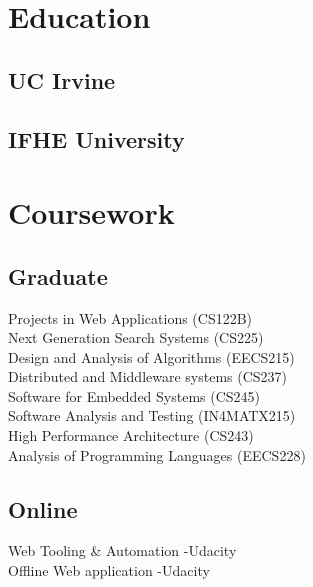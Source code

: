 \documentclass[]{base}
\begin{document}

\begin{minipage}[t]{0.33\textwidth}
	\section{Education} 
	
	\subsection{UC Irvine}
	\sectionsep
	
	\subsection{IFHE University}
	\sectionsep
	
	\section{Coursework}
	\subsection{Graduate}
	Projects in Web Applications (CS122B) \\
	Next Generation Search Systems (CS225) \\
	Design and Analysis of Algorithms (EECS215) \\
	Distributed and Middleware systems (CS237) \\
	Software for Embedded Systems (CS245) \\
	Software Analysis and Testing (IN4MATX215) \\
	High Performance Architecture (CS243) \\
	Analysis of Programming Languages (EECS228) \\
	\subsection{Online}
	Web Tooling \& Automation -Udacity\\
	Offline Web application -Udacity
	

\end{minipage}
\end{document}
